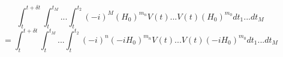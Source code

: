 \begin{equation*}
    \int_{t}^{t+\delta t}\int_{t}^{t_M}...\int_{t}^{t_2}(-i)^M (H_0)^{m_n}V(t)...V(t)(H_0)^{m_0}dt_1...dt_M
\end{equation*}
\begin{equation*}
    = \int_{t}^{t+\delta t}\int_{t}^{t_M}...\int_{t}^{t_2} (-i)^n (-iH_0)^{m_n}V(t)...V(t)(-iH_0)^{m_0}dt_1...dt_M
\end{equation*}
























